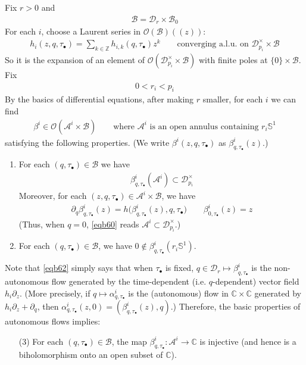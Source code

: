 \documentclass[11pt,b5paper,notitlepage]{article}
\theoremstyle{definition}
\theoremstyle{plain}
\newcommand{\mc}{\mathcal}
\newcommand{\Sbb}{\mathbb{S}}
\newcommand{\blt}{\bullet}
\newcommand{\Cbb}{\mathbb C}
\newcommand{\Zbb}{\mathbb Z}
\newcommand{\<}{\left\langle}
\renewcommand{\>}{\right\rangle}
\newcommand{\MB}{\mathcal{B}}
\numberwithin{equation}{section}
\begin{document}
Fix $r>0$ and
\begin{align*}
\MB=\mc D_r\times \MB_0
\end{align*}
For each $i$, choose a Laurent series in $\mc O(\MB)((z))$: 
\begin{align*}
h_i(z,q,\tau_\blt)=\sum_{k\in\Zbb}h_{i,k}(q,\tau_\blt)z^k\qquad\text{converging a.l.u. on }\mc D_{p_i}^\times\times\MB
\end{align*}
So it is the expansion of an element of $\mc O(\mc D_{p_i}^\times\times\MB)$ with finite poles at $\{0\}\times\MB$. Fix
\begin{align*}
0<r_i<p_i
\end{align*}
By the basics of differential equations, after making $r$ smaller, for each $i$ we can find
\begin{gather*}
\beta^i\in\mc O(\mc A^i\times\MB)\qquad\text{where $\mc A^i$ is an open annulus containing $r_i\Sbb^1$}
\end{gather*}
satisfying the following properties. (We write $\beta^i(z,q,\tau_\blt)$ as $\beta^i_{q,\tau_\blt}(z)$.)
\begin{enumerate}[label=(\arabic*)]
\item For each $(q,\tau_\blt)\in\MB$ we have
\begin{align}\label{eqb60}
\beta^i_{q,\tau_\blt}(\mc A^i)\subset \mc D_{p_i}^\times
\end{align}
Moreover, for each $(z,q,\tau_\blt)\in\mc A^i\times\MB$, we have
\begin{align}\label{eqb62}
\partial_q\beta^i_{q,\tau_\blt}(z)=h\big(\beta^i_{q,\tau_\blt}(z),q,\tau_\blt\big)\qquad \beta^i_{0,\tau_\blt}(z)=z
\end{align}
(Thus, when $q=0$, \eqref{eqb60} reads $\mc A^i\subset \mc D_{p_i}^\times$.)
\item For each $(q,\tau_\blt)\in\MB$, we have $0\notin\beta^i_{q,\tau_\blt}(r_i\Sbb^1)$.
\end{enumerate} 
Note that \eqref{eqb62} simply says that when $\tau_\blt$ is fixed, $q\in\mc D_r\mapsto \beta^i_{q,\tau_\blt}$ is the non-autonomous flow generated by the time-dependent (i.e. $q$-dependent) vector field $h_i\partial_z$. (More precisely, if $q\mapsto \alpha^i_{q,\tau_\blt}$ is the (autonomous) flow in $\Cbb\times\Cbb$ generated by $h_i\partial_z+\partial_q$, then $\alpha^i_{q,\tau_\blt}(z,0)=(\beta^i_{q,\tau_\blt}(z),q)$.) Therefore,  the basic properties of autonomous flows implies:
\begin{enumerate}
\item[(3)] For each $(q,\tau_\blt)\in\mc B$, the map $\beta^i_{q,\tau_\blt}:\mc A^i\rightarrow\Cbb$ is injective (and hence is a biholomorphism onto an open subset of $\Cbb$).
\end{enumerate}
\end{document}
